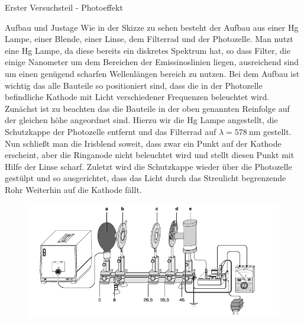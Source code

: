 \documentclass[pdftex, a4paper,11pt, twoside, ngerman]{report}
\begin{document}
         
         
         
  \begin{chapter}{Erster Versuchsteil - Photoeffekt}
    \label{chp:Photoeffekt}
   
   
   
    \begin{section}{Aufbau und Justage}
      \label{chp:photoeffekt:sec:AufbauJustage}
      Wie in der Skizze zu sehen besteht der Aufbau aus einer Hg Lampe, einer
      Blende, einer Linse, dem Filterrad und der Photozelle. Man nutzt eine Hg
      Lampe, da diese bereits ein diskretes Spektrum hat, so dass Filter, die
      einige Nanometer um dem Bereichen der Emissinoslinien liegen,
      ausreichend sind um einen genügend scharfen Wellenlängen bereich zu
      nutzen. Bei dem Aufbau ist wichtig das alle Bauteile so positioniert
      sind, dass die in der Photozelle befindliche Kathode mit Licht
      verschiedener Frequenzen beleuchtet wird. Zunächst ist zu beachten das
      die Bauteile in der oben genannten Reinfolge auf der gleichen höhe
      angeordnet sind. Hierzu wir die Hg Lampe angestellt, die Schutzkappe der
      Photozelle entfernt und das Filterrad auf $\lambda =
      \SI{578}{\nano\meter}$ gestellt. Nun schließt man die Irisblend soweit,
      dass zwar ein Punkt auf der Kathode erscheint, aber die Ringanode nicht
      beleuchtet wird und stellt diesen Punkt mit Hilfe der Linse scharf.
      Zuletzt wird die Schutzkappe wieder über die Photozelle gestülpt und so
      ausgerichtet, dass das Licht durch das Streulicht begrenzende Rohr
      Weiterhin auf die Kathode fällt.
      \begin{figure}[htbp]
        \begin{center}
          \includegraphics[width=.9\textwidth]{Figures/Planckaufbau.png}

\end{center}
\end{figure}
\end{section}
\end{chapter}
\end{document}
